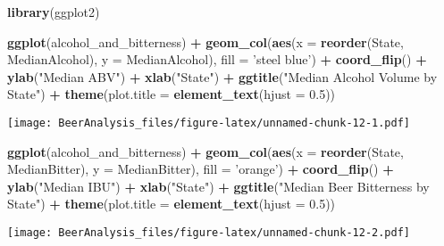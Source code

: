 \documentclass[]{article}
\newenvironment{Shaded}{\begin{snugshade}}{\end{snugshade}}
\newcommand{\DataTypeTok}[1]{\textcolor[rgb]{0.13,0.29,0.53}{#1}}
\newcommand{\FloatTok}[1]{\textcolor[rgb]{0.00,0.00,0.81}{#1}}
\newcommand{\KeywordTok}[1]{\textcolor[rgb]{0.13,0.29,0.53}{\textbf{#1}}}
\newcommand{\NormalTok}[1]{#1}
\newcommand{\OperatorTok}[1]{\textcolor[rgb]{0.81,0.36,0.00}{\textbf{#1}}}
\newcommand{\StringTok}[1]{\textcolor[rgb]{0.31,0.60,0.02}{#1}}
\begin{document}
\begin{Shaded}
\begin{Highlighting}[]
\KeywordTok{library}\NormalTok{(ggplot2)}

\KeywordTok{ggplot}\NormalTok{(alcohol_and_bitterness) }\OperatorTok{+}\StringTok{ }
\StringTok{  }\KeywordTok{geom_col}\NormalTok{(}\KeywordTok{aes}\NormalTok{(}\DataTypeTok{x =} \KeywordTok{reorder}\NormalTok{(State, MedianAlcohol), }\DataTypeTok{y =}\NormalTok{ MedianAlcohol), }\DataTypeTok{fill =} \StringTok{'steel blue'}\NormalTok{) }\OperatorTok{+}\StringTok{ }\KeywordTok{coord_flip}\NormalTok{() }\OperatorTok{+}\StringTok{ }\KeywordTok{ylab}\NormalTok{(}\StringTok{"Median ABV"}\NormalTok{) }\OperatorTok{+}\StringTok{ }\KeywordTok{xlab}\NormalTok{(}\StringTok{"State"}\NormalTok{) }\OperatorTok{+}\StringTok{ }\KeywordTok{ggtitle}\NormalTok{(}\StringTok{"Median Alcohol Volume by State"}\NormalTok{) }\OperatorTok{+}\StringTok{ }\KeywordTok{theme}\NormalTok{(}\DataTypeTok{plot.title =} \KeywordTok{element_text}\NormalTok{(}\DataTypeTok{hjust =} \FloatTok{0.5}\NormalTok{))}
\end{Highlighting}
\end{Shaded}

\texttt{[image: BeerAnalysis\_files/figure-latex/unnamed-chunk-12-1.pdf]}

\begin{Shaded}
\begin{Highlighting}[]
\KeywordTok{ggplot}\NormalTok{(alcohol_and_bitterness) }\OperatorTok{+}\StringTok{ }
\StringTok{  }\KeywordTok{geom_col}\NormalTok{(}\KeywordTok{aes}\NormalTok{(}\DataTypeTok{x =} \KeywordTok{reorder}\NormalTok{(State, MedianBitter), }\DataTypeTok{y =}\NormalTok{ MedianBitter), }\DataTypeTok{fill =} \StringTok{'orange'}\NormalTok{) }\OperatorTok{+}\StringTok{ }\KeywordTok{coord_flip}\NormalTok{() }\OperatorTok{+}\StringTok{ }\KeywordTok{ylab}\NormalTok{(}\StringTok{"Median IBU"}\NormalTok{) }\OperatorTok{+}\StringTok{ }\KeywordTok{xlab}\NormalTok{(}\StringTok{"State"}\NormalTok{) }\OperatorTok{+}\StringTok{ }\KeywordTok{ggtitle}\NormalTok{(}\StringTok{"Median Beer Bitterness by State"}\NormalTok{) }\OperatorTok{+}\StringTok{  }\KeywordTok{theme}\NormalTok{(}\DataTypeTok{plot.title =} \KeywordTok{element_text}\NormalTok{(}\DataTypeTok{hjust =} \FloatTok{0.5}\NormalTok{))}
\end{Highlighting}
\end{Shaded}

\texttt{[image: BeerAnalysis\_files/figure-latex/unnamed-chunk-12-2.pdf]}
\end{document}
